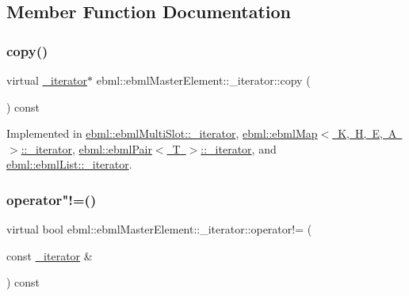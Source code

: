 \subsection{Member Function Documentation}
\mbox{\label{classebml_1_1ebmlMasterElement_1_1__iterator_af9f522b6d6f34acb410add9579a35c13}} 
\subsubsection{\texorpdfstring{copy()}{copy()}}
{\footnotesize\ttfamily virtual \mbox{\hyperlink{classebml_1_1ebmlMasterElement_1_1__iterator}{\+\_\+iterator}}$\ast$ ebml\+::ebml\+Master\+Element\+::\+\_\+iterator\+::copy (\begin{DoxyParamCaption}{ }\end{DoxyParamCaption}) const\hspace{0.3cm}{\ttfamily [pure virtual]}}



Implemented in \mbox{\hyperlink{classebml_1_1ebmlMultiSlot_1_1__iterator_a7f26180e096089e0a14986731bc04326}{ebml\+::ebml\+Multi\+Slot\+::\+\_\+iterator}}, \mbox{\hyperlink{classebml_1_1ebmlMap_1_1__iterator_a4ae1670445455ff5b27e5b3e2bc93142}{ebml\+::ebml\+Map$<$ K, H, E, A $>$\+::\+\_\+iterator}}, \mbox{\hyperlink{classebml_1_1ebmlPair_1_1__iterator_a3f2945c8bbd6b161be18969c9a6ec260}{ebml\+::ebml\+Pair$<$ T $>$\+::\+\_\+iterator}}, and \mbox{\hyperlink{classebml_1_1ebmlList_1_1__iterator_a25602ff7d15a50f42d0acba76d38680c}{ebml\+::ebml\+List\+::\+\_\+iterator}}.

\mbox{\label{classebml_1_1ebmlMasterElement_1_1__iterator_aef9e45972d70a546942f9de73af40dc2}} 
\subsubsection{\texorpdfstring{operator"!=()}{operator!=()}}
{\footnotesize\ttfamily virtual bool ebml\+::ebml\+Master\+Element\+::\+\_\+iterator\+::operator!= (\begin{DoxyParamCaption}\item[{const \mbox{\hyperlink{classebml_1_1ebmlMasterElement_1_1__iterator}{\+\_\+iterator}} \&}]{ }\end{DoxyParamCaption}) const\hspace{0.3cm}{\ttfamily [pure virtual]}}



